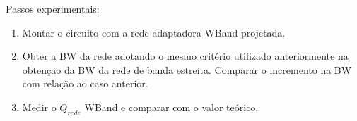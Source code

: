 Passos experimentais:
\begin{enumerate}[label=\alph*]
    \item Montar o circuito com a rede adaptadora WBand projetada.
    
    \item  Obter a BW da rede adotando o mesmo critério utilizado anteriormente na obtenção da BW da rede de banda estreita. Comparar o incremento na BW com relação ao caso anterior.
    
    \item Medir o $Q_{rede}$ WBand e comparar com o valor teórico.
\end{enumerate}

